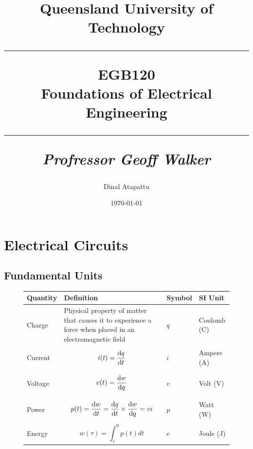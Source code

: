\documentclass[oneside]{book}
\begin{document}
\pagestyle{fancy}
    \fancyhf{}
\fancyhead[R]{\nouppercase{\leftmark}}
\renewcommand{\footrulewidth}{0.4pt}
    \title{
            Queensland University of Technology\\
            \rule{\linewidth}{0.5pt}
        \centering
        \textbf{EGB120} \\
        Foundations of Electrical Engineering\\
        \vspace{0.4cm}
        \rule{\linewidth}{1.5pt}
        \small{\textit{Profressor Geoff Walker}}
    }
    \author{Dinal Atapattu}
    \date{\today}
    \maketitle
    \thispagestyle{empty}
    \tableofcontents
        \chapter{Electrical Circuits}
            \section{Fundamental Units}
                \begin{figure}[H]
                    \centering
                    \begin{tabular}{|p{}|p{}|p{}|p{}|}
                        \hline
                        \textbf{Quantity} & \textbf{Definition} & \textbf{Symbol} & \textbf{SI Unit} \\
                        \hline
                        Charge & Physical property of matter that causes it to experience a force
                        when placed in an electromagnetic field & $q$ & Coulomb (C) \\
                        \hline
                        Current & \begin{equation*}i(t) = \odv{q}{t}\end{equation*} & $i$ & Ampere (A) \\
                        \hline
                        Voltage & \begin{equation*}v(t) = \odv{w}{q}\end{equation*} & $v$ & Volt (V) \\
                        \hline
                        Power & \begin{equation*}p(t) = \odv{w}{t} = \odv{q}{t} \times \odv{w}{q} = vi \end{equation*} & $p$ & Watt (W) \\
                        \hline
                        Energy & \begin{equation*}w(\tau) = \int_{\tau}^{0} p(t) dt\end{equation*} & $e$ & Joule (J) \\
                        \hline
                    \end{tabular}
                \end{figure}
\end{document}
